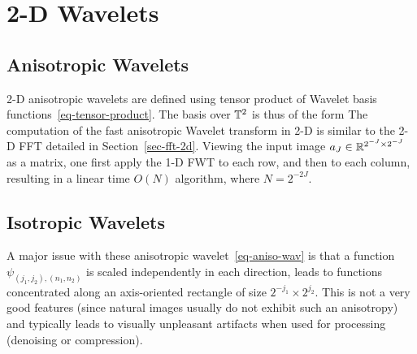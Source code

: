 \section{2-D Wavelets}

\subsection{Anisotropic Wavelets}

2-D anisotropic wavelets are defined using tensor product of Wavelet basis functions~\eqref{eq-tensor-product}. The basis over $\mathbb{T}^2$ is thus of the form
The computation of the fast anisotropic Wavelet transform in 2-D is similar to the 2-D FFT detailed in Section~\ref{sec-fft-2d}. Viewing the input image $a_J \in \mathbb{R}^{2^{-J} \times 2^{-J}}$ as a matrix, one first apply the 1-D FWT to each row, and then to each column, resulting in a linear time $O(N)$ algorithm, where $N=2^{-2J}$. 


\subsection{Isotropic Wavelets}

A major issue with these anisotropic wavelet~\eqref{eq-aniso-wav} is that a function $\psi_{(j_1,j_2),(n_1,n_2)}$ is scaled independently in each direction, leads to functions concentrated along an axis-oriented rectangle of size $2^{-j_1} \times 2^{j_2}$. This is not a very good features (since natural images usually do not exhibit such an anisotropy) and typically leads to visually unpleasant artifacts when used for processing (denoising or compression). 


